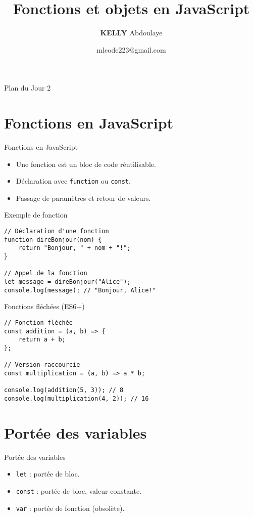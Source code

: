 \documentclass{beamer}
\title{Fonctions et objets en JavaScript}
\author{\textbf{KELLY}  Abdoulaye}
\institute{\textit{Mali\_Code}}
\date{mlcode223@gmail.com}
\begin{document}
\begin{frame}
    \titlepage
\end{frame}
    
\begin{frame}{Plan du Jour 2}
    \tableofcontents
\end{frame}



\section{Fonctions en JavaScript}
\begin{frame}{Fonctions en JavaScript}
\begin{itemize}
    \item Une fonction est un bloc de code réutilisable.
    \item Déclaration avec \texttt{function} ou \texttt{const}.
    \item Passage de paramètres et retour de valeurs.
\end{itemize}
\end{frame}

\begin{frame}[fragile]{Exemple de fonction}
\begin{verbatim}
// Déclaration d'une fonction
function direBonjour(nom) {
    return "Bonjour, " + nom + "!";
}

// Appel de la fonction
let message = direBonjour("Alice");
console.log(message); // "Bonjour, Alice!"
\end{verbatim}
\end{frame}

\begin{frame}[fragile]{Fonctions fléchées (ES6+)}
\begin{verbatim}
// Fonction fléchée
const addition = (a, b) => {
    return a + b;
};

// Version raccourcie
const multiplication = (a, b) => a * b;

console.log(addition(5, 3)); // 8
console.log(multiplication(4, 2)); // 16
\end{verbatim}
\end{frame}

\section{Portée des variables}
\begin{frame}{Portée des variables}
\begin{itemize}
    \item \texttt{let} : portée de bloc.
    \item \texttt{const} : portée de bloc, valeur constante.
    \item \texttt{var} : portée de fonction (obsolète).
\end{itemize}
\end{frame}
\end{document}
